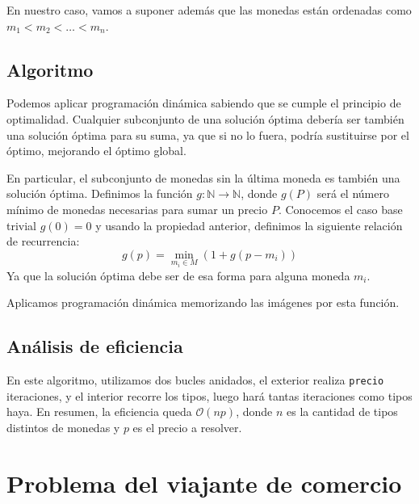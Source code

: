 \documentclass[a4paper, 11pt]{article} %
\begin{document}
    En nuestro caso, vamos a suponer además que las monedas están ordenadas como
    $m_1 < m_2 < \dots < m_n$. 
    
  \subsection{Algoritmo}
    Podemos aplicar programación dinámica sabiendo que se cumple el principio de optimalidad.
    Cualquier subconjunto de una solución óptima debería ser también una solución óptima para
    su suma, ya que si no lo fuera, podría sustituirse por el óptimo, mejorando el óptimo global.
    
    En particular, el subconjunto de monedas sin la última moneda es también una solución óptima.
    Definimos la función $g: \mathbb{N} \to \mathbb{N}$, donde $g(P)$ será el número
    mínimo de monedas necesarias para sumar un precio $P$. Conocemos el caso base trivial $g(0) = 0$ y
    usando la propiedad anterior, definimos la siguiente relación de recurrencia:
    \begin{equation}
      g(p) = \min_{m_i \in M} (1 + g(p - m_i))
    \end{equation}
    Ya que la solución óptima debe ser de esa forma para alguna moneda $m_i$.
  
    Aplicamos programación dinámica memorizando las imágenes por esta función.
 	
 	\subsection{Análisis de eficiencia}
 	En este algoritmo, utilizamos dos bucles anidados,
 	el exterior realiza \texttt{precio} iteraciones, y el interior recorre los tipos, luego hará tantas iteraciones como tipos haya. En resumen, la eficiencia queda $\mathcal{O}(np)$, donde $n$ es la cantidad de tipos distintos de monedas y $p$ es el precio a resolver.
  
\section{Problema del viajante de comercio}
\end{document}
